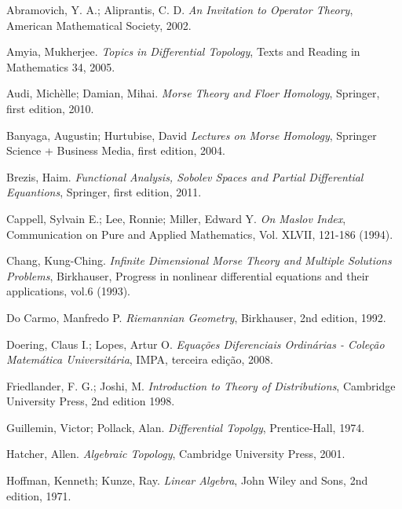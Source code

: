 \documentclass[12pt]{book}
\begin{document}
	
	\begin{thebibliography}{9}
		Abramovich, Y. A.; Aliprantis, C. D.
		\emph{An Invitation to Operator Theory},
		American Mathematical Society, 2002.
		
		Amyia, Mukherjee.
		\emph{Topics in Differential Topology},
		Texts and Reading in Mathematics 34,
		2005.
		
		Audi, Michèlle; Damian, Mihai.
		\emph{Morse Theory and Floer Homology},
		Springer, first edition,
		2010.
		
		Banyaga, Augustin; Hurtubise, David
		\emph{Lectures on Morse Homology},
		Springer Science + Business Media, first edition,
		2004.
		
		Brezis, Haim.
		\emph{Functional Analysis, Sobolev Spaces and Partial Differential Equantions},
		Springer, first edition,
		2011.
		
		Cappell, Sylvain E.; Lee, Ronnie; Miller, Edward Y.
		\emph{On Maslov Index}, Communication on Pure and Applied Mathematics, Vol. XLVII, 121-186 (1994).
		
		Chang, Kung-Ching.
		\emph{Infinite Dimensional Morse Theory and Multiple Solutions Problems}, Birkhauser, Progress in nonlinear differential equations and
		their applications, vol.6 (1993).
		
		Do Carmo, Manfredo P.
		\emph{Riemannian Geometry},
		Birkhauser, 2nd edition,
		1992.
		
		Doering, Claus I.; Lopes, Artur O.
		\emph{Equações Diferenciais Ordinárias - Coleção Matemática Universitária},
		IMPA, terceira edição,
		2008.
		
		Friedlander, F. G.; Joshi, M.
		\emph{Introduction to Theory of Distributions},
		Cambridge University Press, 2nd edition
		1998.
		
		Guillemin, Victor; Pollack, Alan.
		\emph{Differential Topolgy},
		Prentice-Hall,
		1974.	
		
		Hatcher, Allen.
		\emph{Algebraic Topology},
		Cambridge University Press, 2001.
		
		Hoffman, Kenneth; Kunze, Ray.
		\emph{Linear Algebra},
		John Wiley and Sons, 2nd edition, 1971.
		

\end{thebibliography}
\end{document}
